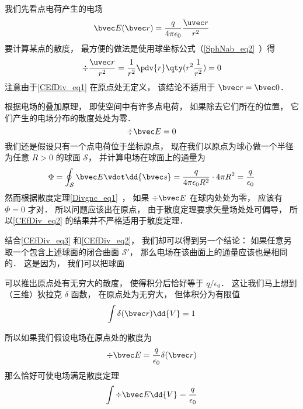 

我们先看点电荷产生的电场
\begin{equation}\label{CEfDiv_eq1}
\bvec E(\bvec r) = \frac{q}{4\pi\epsilon_0}\frac{\uvec r}{r^2}
\end{equation}
要计算某点的散度， 最方便的做法是使用球坐标公式（\autoref{SphNab_eq2}~）得
\begin{equation}
\div \frac{\uvec r}{r^2} = \frac{1}{r^2} \pdv{r} \qty(r^2 \frac{1}{r^2}) = 0
\end{equation}
注意由于\autoref{CEfDiv_eq1} 在原点处无定义， 该结论不适用于 $\bvec r = \bvec 0$．

根据电场的叠加原理， 即使空间中有许多点电荷， 如果除去它们所在的位置， 它们产生的电场分布的散度处处为零．
\begin{equation}\label{CEfDiv_eq3}
\div \bvec E = 0
\end{equation}
我们还是假设只有一个点电荷位于坐标原点， 现在我们以原点为球心做一个半径为任意 $R > 0$ 的球面 $\mathcal S$， 并计算电场在球面上的通量为
\begin{equation}\label{CEfDiv_eq2}
\Phi = \oint_{\mathcal S} \bvec E \vdot \dd{\bvec s} = \frac{q}{4\pi\epsilon_0 R^2} \cdot 4\pi R^2 = \frac{q}{\epsilon_0}
\end{equation}
然而根据散度定理\autoref{Divgnc_eq1}~， 如果 $\div \bvec E$ 在球内处处为零， 应该有 $\Phi = 0$ 才对． 所以问题应该出在原点， 由于散度定理要求矢量场处处可偏导， 所以\autoref{CEfDiv_eq2} 的结果并不严格适用于散度定理．

结合\autoref{CEfDiv_eq3} 和\autoref{CEfDiv_eq2}， 我们却可以得到另一个结论： 如果任意另取一个包含上述球面的闭合曲面 $\mathcal S'$， 那么电场在该曲面上的通量应该也是相同的． 这是因为， 我们可以把球面

可以推出原点处有无穷大的散度， 使得积分后恰好等于 $q/\epsilon_0$． 这让我们马上想到（三维）狄拉克 $\delta$ 函数， 在原点处为无穷大， 但体积分为有限值
\begin{equation}
\int \delta(\bvec r)\dd{V} = 1
\end{equation}

所以如果我们假设电场在原点处的散度为
\begin{equation}
\div \bvec E = \frac{q}{\epsilon_0}\delta(\bvec r)
\end{equation}
那么恰好可使电场满足散度定理
\begin{equation}
\int \div \bvec E \dd{V} = \frac{q}{\epsilon_0}
\end{equation}
